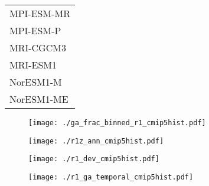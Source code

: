 \documentclass{ametsocV5}
\begin{document}
\begin{table}[t]
\begin{center}
\begin{tabular}{ l }
    MPI-ESM-MR      \\%
    MPI-ESM-P       \\%
    MRI-CGCM3       \\%
    MRI-ESM1        \\%
    NorESM1-M       \\%
    NorESM1-ME      \\%

  \end{tabular}
\end{center}
\end{table}

\begin{figure}[t]
  \noindent\texttt{[image: ./ga\_frac\_binned\_r1\_cmip5hist.pdf]}\\
  \label{fig:cmip5-binned-r1}
\end{figure}

\begin{figure}[t]
  \noindent\texttt{[image: ./r1z\_ann\_cmip5hist.pdf]}\\
  \label{fig:cmip5hist-r1-ann}
\end{figure}

\begin{figure}[t]
  \centering
  \noindent\texttt{[image: ./r1\_dev\_cmip5hist.pdf]}\\
  \label{fig:cmip5hist-r1-dev}
\end{figure}

\begin{figure}[t]
  \noindent\texttt{[image: ./r1\_ga\_temporal\_cmip5hist.pdf]}\\
  \label{fig:cmip5hist-r1-ga-temporal}
\end{figure}
\end{document}

